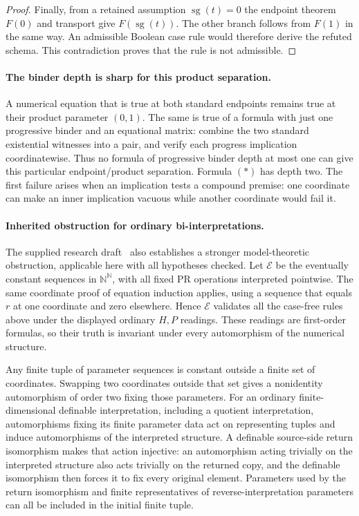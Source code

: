 \documentclass[11pt,letterpaper]{article}
\theoremstyle{definition}\newtheorem{definition}[theorem]{Definition}
\theoremstyle{remark}\newtheorem{remark}[theorem]{Remark}
\begin{document}
\begin{proof}
Finally, from a retained assumption $\operatorname{sg}(t)=0$ the
endpoint theorem $F(0)$ and transport give $F(\operatorname{sg}(t))$.
The other branch follows from $F(1)$ in the same way. An admissible
Boolean case rule would therefore derive the refuted schema. This
contradiction proves that the rule is not admissible.
\end{proof}

\paragraph{The binder depth is sharp for this product separation.}
A numerical equation that is true at both standard endpoints remains
true at their product parameter $(0,1)$. The same is true of a formula
with just one progressive binder and an equational matrix: combine
the two standard existential witnesses into a pair, and verify each
progress implication coordinatewise. Thus no formula of progressive
binder depth at most one can give this particular endpoint/product
separation. Formula $(*)$ has depth two. The first failure arises when
an implication tests a compound premise: one coordinate can make an
inner implication vacuous while another coordinate would fail it.

\paragraph{Inherited obstruction for ordinary bi-interpretations.}
The supplied research draft~\cite{research} also establishes a stronger model-theoretic
obstruction, applicable here with all hypotheses checked. Let
$\mathcal E$ be the eventually constant sequences in $\mathbb N^{\mathbb N}$,
with all fixed PR operations interpreted pointwise. The same coordinate
proof of equation induction applies, using a sequence that equals $r$ at
one coordinate and zero elsewhere. Hence $\mathcal E$ validates all the
case-free rules above under the displayed ordinary $H,P$ readings.
These readings are first-order formulas, so their truth is invariant
under every automorphism of the numerical structure.

Any finite tuple of parameter sequences is constant outside a finite
set of coordinates. Swapping two coordinates outside that set gives a
nonidentity automorphism of order two fixing those parameters. For an
ordinary finite-dimensional definable interpretation, including a
quotient interpretation, automorphisms fixing its finite parameter data
act on representing tuples and induce automorphisms of the interpreted
structure. A definable source-side return isomorphism makes that action
injective: an automorphism acting trivially on the interpreted structure
also acts trivially on the returned copy, and the definable isomorphism
then forces it to fix every original element. Parameters used by the
return isomorphism and finite representatives of reverse-interpretation
parameters can all be included in the initial finite tuple.
\end{document}
